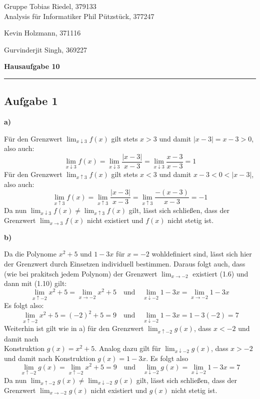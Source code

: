 \documentclass[a4paper,graphics,11pt]{article}
\newcommand{\aufgabe}[1]{\subsection*{Aufgabe #1}}
\begin{document}
\noindent Gruppe              \hfill Tobias Riedel, 379133 \\
\noindent Analysis für Informatiker             \hfill Phil Pützstück, 377247 \\
\strut\hfill Kevin Holzmann, 371116\\
\strut\hfill Gurvinderjit Singh, 369227
\begin{center}
	\LARGE{\textbf{Hausaufgabe 10}}
\end{center}
\begin{center}
\rule[0.1ex]{\textwidth}{1pt}
\end{center}



\aufgabe{1}
\textbf{a)}

Für den Grenzwert $\lim_{x \downarrow 3}\limits f(x)$ gilt stets $x > 3$ und damit
$|x-3| = x-3 > 0$, also auch:
$$
    \lim_{x \downarrow 3} f(x)
    = \lim_{x \downarrow 3} \frac{|x-3|}{x-3}
    = \lim_{x \downarrow 3} \frac{x-3}{x-3}
    = 1
$$
Für den Grenzwert $\lim_{x \uparrow 3}\limits f(x)$ gilt stets $x < 3$ und damit
$x-3 < 0 < |x-3|$, also auch:
$$
    \lim_{x \uparrow 3} f(x)
    = \lim_{x \uparrow 3} \frac{|x-3|}{x-3}
    = \lim_{x \uparrow 3} \frac{-(x-3)}{x-3}
    = -1
$$
Da nun $\lim_{x \downarrow 3}\limits f(x) \neq \lim_{x \uparrow 3}\limits f(x)$ gilt,
lässt sich schließen, dass der Grenzwert $\lim_{x \to 3}\limits f(x)$ nicht existiert und
$f(x)$ nicht stetig ist.

\textbf{b)}

Da die Polynome $x^2+5$ und $1-3x$ für $x = -2$ wohldefiniert sind, lässt sich hier der
Grenzwert durch Einsetzen individuell bestimmen. Daraus folgt auch, dass (wie bei prakitsch
jedem Polynom) der Grenzwert $\lim_{x \to -2}\limits$ existiert (1.6) und dann mit (1.10) gilt:
$$ \lim_{x \uparrow -2} x^2+5 = \lim_{x \to -2} x^2+5
    \quad\text{und}\quad
    \lim_{x \downarrow -2} 1-3x = \lim_{x \to -2} 1-3x
$$
Es folgt also:
$$
    \lim_{x \uparrow -2} x^2+5 = (-2)^2+5 = 9
    \quad\text{und}\quad
    \lim_{x \downarrow -2} 1-3x = 1-3(-2) = 7
$$
Weiterhin ist gilt wie in a) für den Grenzwert $\lim_{x \uparrow -2}\limits g(x)$, dass $x<-2$
und damit nach\\
Konstruktion $g(x) = x^2+5$. Analog dazu gilt für $\lim_{x \downarrow -2}\limits g(x)$,
dass $x>-2$ und damit nach Konstruktion $g(x) = 1-3x$. Es folgt also
$$
    \lim_{x \uparrow -2} g(x) = \lim_{x \uparrow -2} x^2+5 = 9
    \quad\text{und}\quad
    \lim_{x \downarrow -2} g(x) = \lim_{x \downarrow -2} 1-3x = 7
$$
Da nun $\lim_{x \uparrow -2}\limits g(x) \neq \lim_{x \downarrow -2}\limits g(x)$ gilt,
lässt sich schließen, dass der Grenzwert $\lim_{x \to -2}\limits g(x)$ nicht existiert und
$g(x)$ nicht stetig ist.
\newpage
\end{document}
